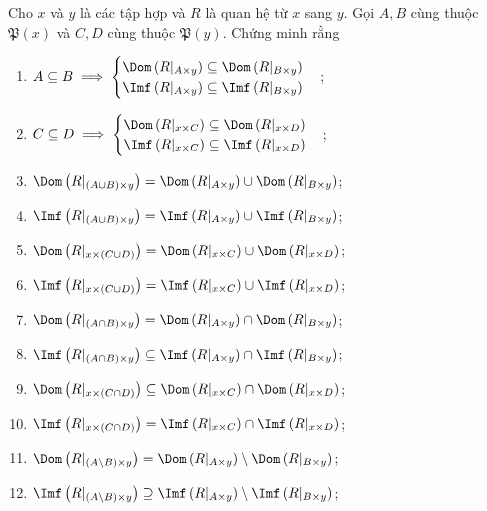 \exercise Cho $x$ và $y$ là các tập hợp và $R$ là quan hệ từ $x$ sang $y$. Gọi $A, B$ cùng thuộc $\mathfrak{P}(x)$ và $C, D$ cùng thuộc $\mathfrak{P}(y)$. Chứng minh rằng
\begin{enumerate}
   \item $A \subseteq B \implies \begin{cases}
      \Dom\left(R|_{A \times y}\right) \subseteq \Dom\left(R|_{B \times y}\right) \\
      \Imf\left(R|_{A \times y}\right) \subseteq \Imf\left(R|_{B \times y}\right) 
   \end{cases}$;
   \item $C \subseteq D \implies \begin{cases}
      \Dom\left(R|_{x \times C}\right) \subseteq \Dom\left(R|_{x \times D}\right) \\
      \Imf\left(R|_{x \times C}\right) \subseteq \Imf\left(R|_{x \times D}\right) 
   \end{cases}$;
   \item $\Dom\left(R|_{(A\cup B) \times y}\right) = \Dom\left(R|_{A \times y}\right) \cup \Dom\left(R|_{B \times y}\right)$;
   \item $\Imf\left(R|_{(A\cup B) \times y}\right) = \Imf\left(R|_{A \times y}\right) \cup \Imf\left(R|_{B \times y}\right)$;
   \item $\Dom\left(R|_{x \times (C \cup D)}\right) = \Dom\left(R|_{x \times C}\right) \cup \Dom\left(R|_{x \times D}\right)$;
   \item $\Imf\left(R|_{x \times (C \cup D)}\right) = \Imf\left(R|_{x \times C}\right) \cup \Imf\left(R|_{x \times D}\right)$;
   \item $\Dom\left(R|_{(A\cap B) \times y}\right) = \Dom\left(R|_{A \times y}\right) \cap \Dom\left(R|_{B \times y}\right)$;
   \item $\Imf\left(R|_{(A\cap B) \times y}\right) \subseteq \Imf\left(R|_{A \times y}\right) \cap \Imf\left(R|_{B \times y}\right)$;
   \item $\Dom\left(R|_{x \times (C \cap D)}\right) \subseteq \Dom\left(R|_{x \times C}\right) \cap \Dom\left(R|_{x \times D}\right)$;
   \item $\Imf\left(R|_{x \times (C \cap D)}\right) = \Imf\left(R|_{x \times C}\right) \cap \Imf\left(R|_{x \times D}\right)$;
   \item $\Dom\left(R|_{(A\setminus B) \times y}\right) = \Dom\left(R|_{A \times y}\right) \setminus \Dom\left(R|_{B \times y}\right)$;
   \item $\Imf\left(R|_{(A\setminus B) \times y}\right) \supseteq \Imf\left(R|_{A \times y}\right) \setminus \Imf\left(R|_{B \times y}\right)$;

\end{enumerate}
